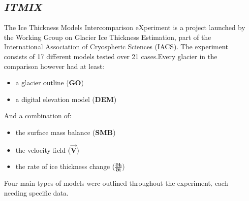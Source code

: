\documentclass[a4, 12pt]{article}
\begin{document}
\subsection{\textit{ITMIX}}
The Ice Thickness Models Intercomparison eXperiment \citep{farinotti2016accurate} is a project launched by the Working Group on Glacier Ice Thickness Estimation, part of the International Association of Cryospheric Sciences (IACS).
The experiment consists of 17 different models tested over 21 cases.Every glacier in the comparison however had at least:
\begin{itemize}
\item a glacier outline (\textbf{GO}) 
\item a digital elevation model (\textbf{DEM})
\end{itemize}
And a combination of:
\begin{itemize}
\item the surface mass balance (\textbf{SMB})
\item the velocity field ($\boldsymbol{\vec{V}}$)
\item the rate of ice thickness change ($\boldsymbol{\frac{\partial h}{\partial t}}$)
\end{itemize}
Four main types of models were outlined throughout the experiment, each needing specific data.
\end{document}
